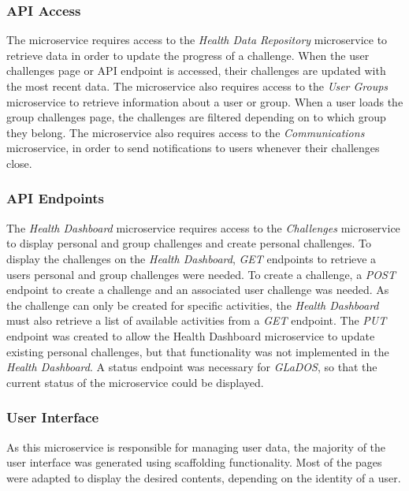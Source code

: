\subsubsection{API Access}
\par
The microservice requires access to the \textit{Health Data Repository} microservice to retrieve data in order to update the progress of a challenge. When the user challenges page or API endpoint is accessed, their challenges are updated with the most recent data.
The microservice also requires access to the \textit{User Groups} microservice to retrieve information about a user or group. When a user loads the group challenges page, the challenges are filtered depending on to which group they belong.
The microservice also requires access to the \textit{Communications} microservice, in order to send notifications to users whenever their challenges close.

\subsubsection{API Endpoints}
\par
The \textit{Health Dashboard} microservice requires access to the \textit{Challenges} microservice to display personal and group challenges and create personal challenges. To display the challenges on the \textit{Health Dashboard}, \textit{GET} endpoints to retrieve a users personal and group challenges were needed. To create a challenge, a \textit{POST} endpoint to create a challenge and an associated user challenge was needed. As the challenge can only be created for specific activities, the \textit{Health Dashboard} must also retrieve a list of available activities from a \textit{GET} endpoint.
The \textit{PUT} endpoint was created to allow the Health Dashboard microservice to update existing personal challenges, but that functionality was not implemented in the \textit{Health Dashboard}.
A status endpoint was necessary for \textit{GLaDOS}, so that the current status of the microservice could be displayed.

\subsubsection{User Interface}
\par
As this microservice is responsible for managing user data, the majority of the user interface was generated using scaffolding functionality. Most of the pages were adapted to display the desired contents, depending on the identity of a user.
